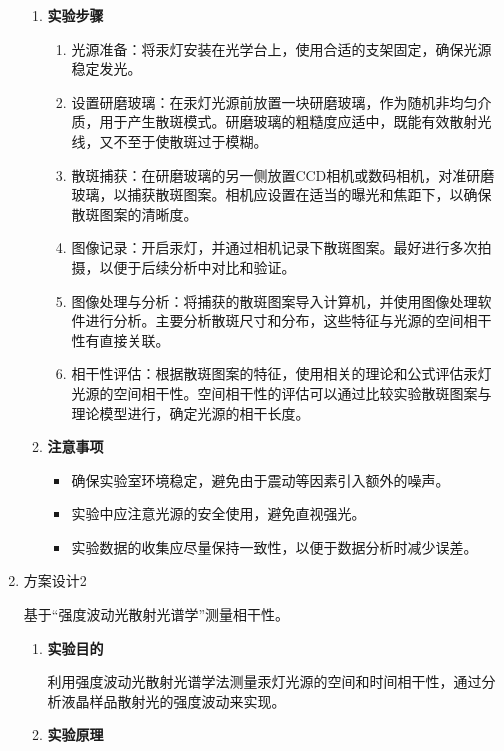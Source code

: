 \documentclass[dvipsnames, svgnames,a4paper,11pt]{article}
\begin{document}
\begin{enumerate}
\begin{enumerate}
			\item \textbf{实验步骤}
			
			\begin{enumerate}
				\item 光源准备：将汞灯安装在光学台上，使用合适的支架固定，确保光源稳定发光。
				\item 设置研磨玻璃：在汞灯光源前放置一块研磨玻璃，作为随机非均匀介质，用于产生散斑模式。研磨玻璃的粗糙度应适中，既能有效散射光线，又不至于使散斑过于模糊。
				\item 散斑捕获：在研磨玻璃的另一侧放置CCD相机或数码相机，对准研磨玻璃，以捕获散斑图案。相机应设置在适当的曝光和焦距下，以确保散斑图案的清晰度。
				\item 图像记录：开启汞灯，并通过相机记录下散斑图案。最好进行多次拍摄，以便于后续分析中对比和验证。
				\item 图像处理与分析：将捕获的散斑图案导入计算机，并使用图像处理软件进行分析。主要分析散斑尺寸和分布，这些特征与光源的空间相干性有直接关联。
				\item 相干性评估：根据散斑图案的特征，使用相关的理论和公式评估汞灯光源的空间相干性。空间相干性的评估可以通过比较实验散斑图案与理论模型进行，确定光源的相干长度。
			\end{enumerate}
			
			\item \textbf{注意事项}
			
			\begin{itemize}
				\item 确保实验室环境稳定，避免由于震动等因素引入额外的噪声。
				\item 实验中应注意光源的安全使用，避免直视强光。
				\item 实验数据的收集应尽量保持一致性，以便于数据分析时减少误差。
			\end{itemize}
			
		\end{enumerate}
		
		\item 方案设计2
		
		基于“强度波动光散射光谱学”测量相干性。
		
		\begin{enumerate}
			\item \textbf{实验目的}
			
			利用强度波动光散射光谱学法测量汞灯光源的空间和时间相干性，通过分析液晶样品散射光的强度波动来实现。
			
			\item \textbf{实验原理}
			

\end{enumerate}
\end{enumerate}
\end{document}
